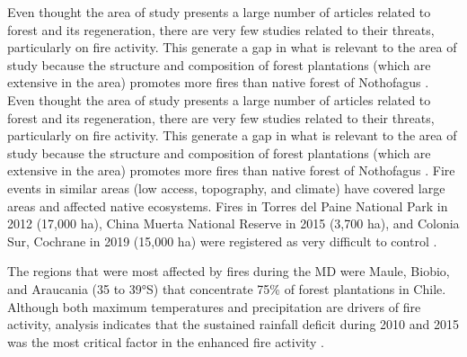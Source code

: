 \documentclass[]{article}
\begin{document}
Even thought the area of study presents a large number of articles related to forest and its regeneration, there are very few studies related to their threats, particularly on fire activity.
This generate a gap in what is relevant to the area of study because the structure and composition of forest plantations (which are extensive in the area) promotes more fires than native forest of Nothofagus \citep{Gonzalez2018Mega, McWethy2018fire}.
Even thought the area of study presents a large number of articles related to forest and its regeneration, there are very few studies related to their threats, particularly on fire activity.
This generate a gap in what is relevant to the area of study because the structure and composition of forest plantations (which are extensive in the area) promotes more fires than native forest of Nothofagus \citep{Gonzalez2018Mega, McWethy2018fire}. Fire events in similar areas (low access, topography, and climate) have covered large areas and affected native ecosystems. Fires in Torres del Paine National Park in 2012 (17,000 ha), China Muerta National Reserve in 2015 (3,700 ha), and Colonia Sur, Cochrane in 2019 (15,000 ha) were registered as very difficult to control \citep{Arroyo2019COP}.

The regions that were most affected by fires during the MD were Maule, Biobio, and Araucania (35 to 39°S) that concentrate 75\% of forest plantations in Chile. Although both maximum temperatures and precipitation are drivers of fire activity, analysis indicates that the sustained rainfall deficit during 2010 and 2015 was the most critical factor in the enhanced fire activity \citep{Gonzalez2018Mega}.
\end{document}
